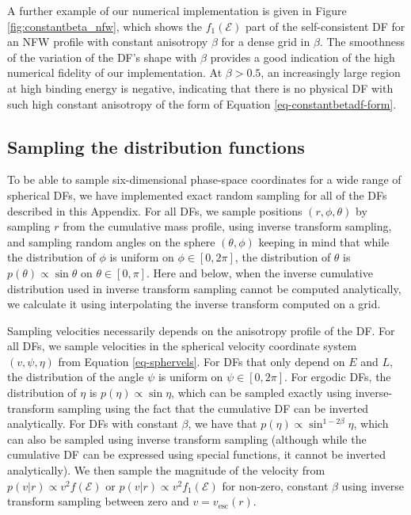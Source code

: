 A further example of our numerical implementation is given in Figure \ref{fig:constantbeta_nfw}, which shows the $f_1(\mathcal{E})$ part of the self-consistent DF for an NFW profile with constant anisotropy $\beta$ for a dense grid in $\beta$. The smoothness of the variation of the DF's shape with $\beta$ provides a good indication of the high numerical fidelity of our implementation. At $\beta > 0.5$, an increasingly large region at high binding energy is negative, indicating that there is no physical DF with such high constant anisotropy of the form of Equation \eqref{eq-constantbetadf-form}.

\subsection{Sampling the distribution functions}

To be able to sample six-dimensional phase-space coordinates for a wide range of spherical DFs, we have implemented exact random sampling for all of the DFs described in this Appendix. For all DFs, we sample positions $(r,\phi,\theta)$ by sampling $r$ from the cumulative mass profile, using inverse transform sampling, and sampling random angles on the sphere $(\theta,\phi)$ keeping in mind that while the distribution of $\phi$ is uniform on $ \phi \in [0,2\pi]$, the distribution of $\theta$ is $p(\theta)\propto \sin \theta$ on $\theta \in [0,\pi]$. Here and below, when the inverse cumulative distribution used in inverse transform sampling cannot be computed analytically, we calculate it using interpolating the inverse transform computed on a grid.

Sampling velocities necessarily depends on the anisotropy profile of the DF. For all DFs, we sample velocities in the spherical velocity coordinate system $(v,\psi,\eta)$ from Equation \eqref{eq-sphervels}. For DFs that only depend on $E$ and $L$, the distribution of the angle $\psi$ is uniform on $\psi \in [0,2\pi]$. For ergodic DFs, the distribution of $\eta$ is $p(\eta) \propto \sin \eta$, which can be sampled exactly using inverse-transform sampling using the fact that the cumulative DF can be inverted analytically. For DFs with constant $\beta$, we have that $p(\eta) \propto \sin^{1-2\beta}\eta$, which can also be sampled using inverse transform sampling (although while the cumulative DF can be expressed using special functions, it cannot be inverted analytically). We then sample the magnitude of the velocity from $p(v|r) \propto v^2 f(\mathcal{E})$ or $p(v|r) \propto v^2 f_1(\mathcal{E})$ for non-zero, constant $\beta$ using inverse transform sampling between zero and $v = v_{\mathrm{esc}}(r)$.

